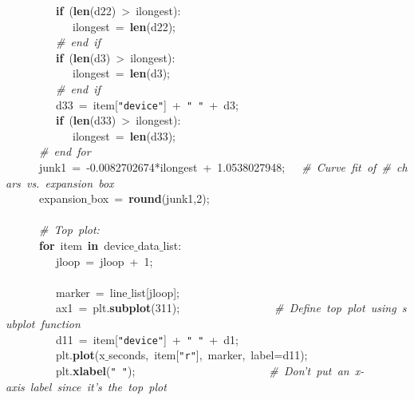 \mbox{}\ \ \ \ \ \ \ \ \ \textbf{if}\ (\textbf{len}(d22)\ \textgreater{}\ ilongest): \\
\mbox{}\ \ \ \ \ \ \ \ \ \ \ \ ilongest\ =\ \textbf{len}(d22); \\
\mbox{}\ \ \ \ \ \ \ \ \ \textit{\#\ end\ if} \\
\mbox{}\ \ \ \ \ \ \ \ \ \textbf{if}\ (\textbf{len}(d3)\ \textgreater{}\ ilongest): \\
\mbox{}\ \ \ \ \ \ \ \ \ \ \ \ ilongest\ =\ \textbf{len}(d3); \\
\mbox{}\ \ \ \ \ \ \ \ \ \textit{\#\ end\ if} \\
\mbox{}\ \ \ \ \ \ \ \ \ d33\ =\ item[\texttt{"{}device"{}}]\ +\ \texttt{"{}\ "{}}\ +\ d3; \\
\mbox{}\ \ \ \ \ \ \ \ \ \textbf{if}\ (\textbf{len}(d33)\ \textgreater{}\ ilongest): \\
\mbox{}\ \ \ \ \ \ \ \ \ \ \ \ ilongest\ =\ \textbf{len}(d33); \\
\mbox{}\ \ \ \ \ \ \textit{\#\ end\ for} \\
\mbox{}\ \ \ \ \ \ junk1\ =\ -0.0082702674*ilongest\ +\ 1.0538027948;\ \ \ \textit{\#\ Curve\ fit\ of\ \#\ chars\ vs.\ expansion\ box} \\
\mbox{}\ \ \ \ \ \ expansion$\_$box\ =\ \textbf{round}(junk1,2); \\
\mbox{}\ \ \ \ \ \  \\
\mbox{}\ \ \ \ \ \ \textit{\#\ Top\ plot:} \\
\mbox{}\ \ \ \ \ \ \textbf{for}\ item\ \textbf{in}\ device$\_$data$\_$list: \\
\mbox{}\ \ \ \ \ \ \ \ \ jloop\ =\ jloop\ +\ 1; \\
\mbox{}\ \ \ \ \ \ \ \ \  \\
\mbox{}\ \ \ \ \ \ \ \ \ marker\ =\ line$\_$list[jloop]; \\
\mbox{}\ \ \ \ \ \ \ \ \ ax1\ =\ plt.\textbf{subplot}(311);\ \ \ \ \ \ \ \ \ \ \ \ \ \ \ \ \ \textit{\#\ Define\ top\ plot\ using\ subplot\ function} \\
\mbox{}\ \ \ \ \ \ \ \ \ d11\ =\ item[\texttt{"{}device"{}}]\ +\ \texttt{"{}\ "{}}\ +\ d1; \\
\mbox{}\ \ \ \ \ \ \ \ \ plt.\textbf{plot}(x$\_$seconds,\ item[\texttt{"{}r"{}}],\ marker,\ label=d11); \\
\mbox{}\ \ \ \ \ \ \ \ \ plt.\textbf{xlabel}(\texttt{"{}\ "{}});\ \ \ \ \ \ \ \ \ \ \ \ \ \ \ \ \ \ \ \ \ \ \ \ \textit{\#\ Don't\ put\ an\ x-axis\ label\ since\ it's\ the\ top\ plot} \\
